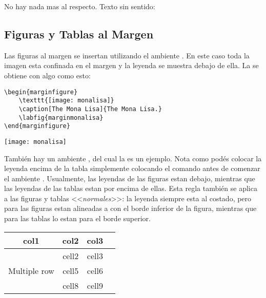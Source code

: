 No hay nada mas al respecto. Texto sin sentido: \blindtext

\subsection{Figuras y Tablas al Margen}
Las figuras al margen se insertan utilizando el ambiente . En este caso toda la imagen esta confinada en el margen y la leyenda se muestra debajo de ella. La  se obtiene con algo como esto:

\begin{lstlisting}[caption={Otra leyenda.}]
\begin{marginfigure}
    \texttt{[image: monalisa]}
    \caption[The Mona Lisa]{The Mona Lisa.}
    \labfig{marginmonalisa}
\end{marginfigure}
\end{lstlisting}

\begin{marginfigure}[-5.5cm]
	\texttt{[image: monalisa]}
	\caption[La Mona Lisa, una vez mas.]{La Mona Lisa, una vez mas.\\ 
	\url{https://commons.wikimedia.org/wiki/File:Mona_Lisa,_by_Leonardo_da_Vinci,_from_C2RMF_retouched.jpg}}
\end{marginfigure}

También hay un ambiente , del cual la  es un ejemplo. Nota como podés colocar la leyenda encima de la tabla simplemente colocando el comando  antes de comenzar el ambiente . Usualmente, las leyendas de las figuras estan debajo, mientras que las leyendas de las tablas estan por encima de ellas. Esta regla también se aplica a las figuras y tablas <<\emph{normales}>>: la leyenda siempre esta al costado, pero para las figuras estan alineadas a con el borde inferior de la figura, mientras que para las tablas lo estan para el borde superior.

\begin{margintable}
    \caption[Otra tabla inútil]{Otra tabla inútil.}
    \raggedright
    \begin{tabular}{ c c c c }
        \hline
        col1 & col2 & col3 \\
        \hline
        \multirow{3}{4em}{Multiple row} & cell2 & cell3 \\ & cell5 & cell6 
        \\ & cell8 & cell9 \\ \hline
    \end{tabular}
\end{margintable}


